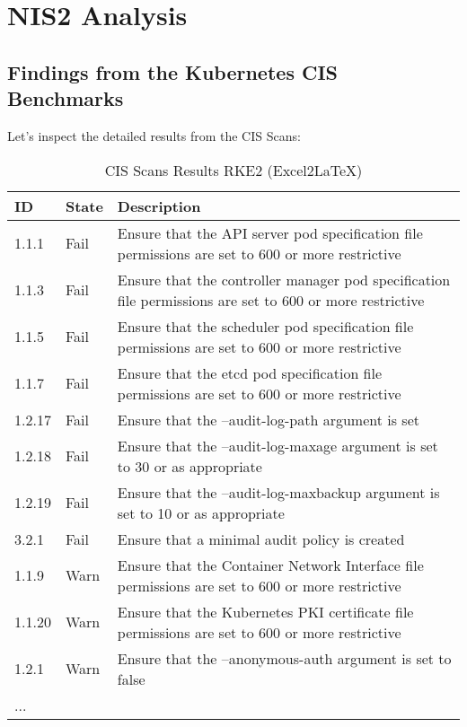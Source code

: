 %
%

\pagebreak
\section{NIS2 Analysis}

\onehalfspacing

\subsection{Findings from the Kubernetes CIS Benchmarks}

Let's inspect the detailed results from the CIS Scans:

\begin{table}[h]
  \centering
  \caption{CIS Scans Results RKE2 (Excel2LaTeX)}
    \begin{tabular}{| l | l | p{11.6cm} |}
    \hline
    ID & State & Description \\
    \hline\hline
    1.1.1 & Fail  & Ensure that the API server pod specification file permissions are set to 600 or more restrictive \\
    \hline
    1.1.3 & Fail  & Ensure that the controller manager pod specification file permissions are set to 600 or more restrictive \\
    \hline
    1.1.5 & Fail  & Ensure that the scheduler pod specification file permissions are set to 600 or more restrictive \\
    \hline
    1.1.7 & Fail  & Ensure that the etcd pod specification file permissions are set to 600 or more restrictive \\
    \hline
    1.2.17 & Fail  & Ensure that the --audit-log-path argument is set \\
    \hline
    1.2.18 & Fail  & Ensure that the --audit-log-maxage argument is set to 30 or as appropriate \\
    \hline
    1.2.19 & Fail  & Ensure that the --audit-log-maxbackup argument is set to 10 or as appropriate \\
    \hline
    3.2.1 & Fail  & Ensure that a minimal audit policy is created \\
    \hline
    1.1.9 & Warn  & Ensure that the Container Network Interface file permissions are set to 600 or more restrictive \\
    \hline
    1.1.20 & Warn  & Ensure that the Kubernetes PKI certificate file permissions are set to 600 or more restrictive \\
    \hline
    1.2.1 & Warn  & Ensure that the --anonymous-auth argument is set to false \\
    \hline
    ... & & \\
    \hline
    \end{tabular}%
  \label{tab:rke2Scan}%
\end{table}%

